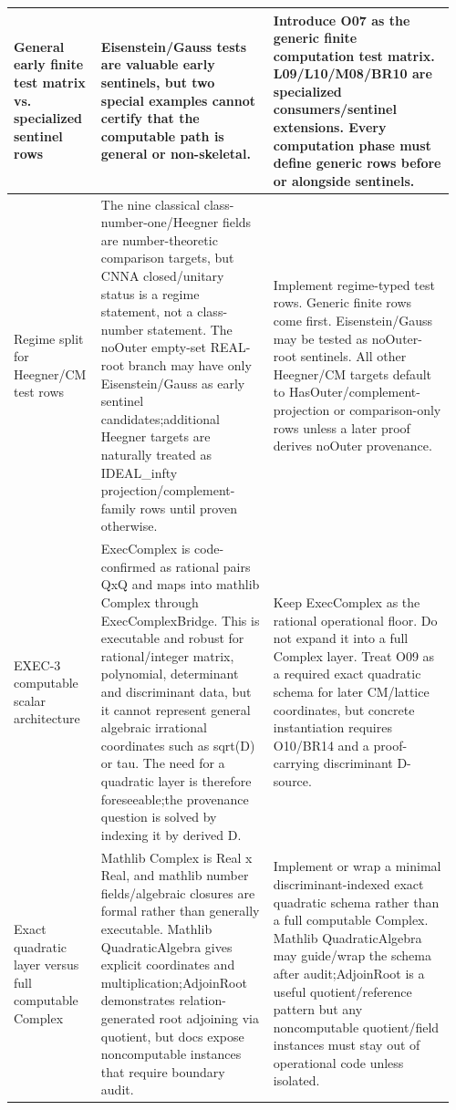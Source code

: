 \begin{longtable}{L{0.18\linewidth} L{0.38\linewidth} L{0.4\linewidth}}
\hline
\addlinespace[0.24em]
General early finite test matrix vs. specialized sentinel rows & Eisenstein/\allowbreak{}Gauss tests are valuable early sentinels, but two special examples cannot certify that the computable path is general or non-skeletal. & Introduce O07 as the generic finite computation test matrix. L09/\allowbreak{}L10/\allowbreak{}M08/\allowbreak{}BR10 are specialized consumers/\allowbreak{}sentinel extensions. Every computation phase must define generic rows before or alongside sentinels.\\
\hline
\addlinespace[0.24em]
Regime split for Heegner/\allowbreak{}CM test rows & The nine classical class-number-one/\allowbreak{}Heegner fields are number-theoretic comparison targets, but CNNA closed/\allowbreak{}unitary status is a regime statement, not a class-number statement. The noOuter empty-set REAL-root branch may have only Eisenstein/\allowbreak{}Gauss as early sentinel candidates;\newline additional Heegner targets are naturally treated as IDEAL\_infty projection/\allowbreak{}complement-family rows until proven otherwise. & Implement regime-typed test rows. Generic finite rows come first. Eisenstein/\allowbreak{}Gauss may be tested as noOuter-root sentinels. All other Heegner/\allowbreak{}CM targets default to HasOuter/\allowbreak{}complement-projection or comparison-only rows unless a later proof derives noOuter provenance.\\
\hline
\addlinespace[0.24em]
EXEC-3 computable scalar architecture & ExecComplex is code-confirmed as rational pairs QxQ and maps into mathlib Complex through ExecComplexBridge. This is executable and robust for rational/\allowbreak{}integer matrix, polynomial, determinant and discriminant data, but it cannot represent general algebraic irrational coordinates such as sqrt(D) or tau. The need for a quadratic layer is therefore foreseeable;\newline the provenance question is solved by indexing it by derived D. & Keep ExecComplex as the rational operational floor. Do not expand it into a full Complex layer. Treat O09 as a required exact quadratic schema for later CM/\allowbreak{}lattice coordinates, but concrete instantiation requires O10/\allowbreak{}BR14 and a proof-carrying discriminant D-source.\\
\hline
\addlinespace[0.24em]
Exact quadratic layer versus full computable Complex & Mathlib Complex is Real x Real, and mathlib number fields/\allowbreak{}algebraic closures are formal rather than generally executable. Mathlib QuadraticAlgebra gives explicit coordinates and multiplication;\newline AdjoinRoot demonstrates relation-generated root adjoining via quotient, but docs expose noncomputable instances that require boundary audit. & Implement or wrap a minimal discriminant-indexed exact quadratic schema rather than a full computable Complex. Mathlib QuadraticAlgebra may guide/\allowbreak{}wrap the schema after audit;\newline AdjoinRoot is a useful quotient/\allowbreak{}reference pattern but any noncomputable quotient/\allowbreak{}field instances must stay out of operational code unless isolated.\\

\end{longtable}
